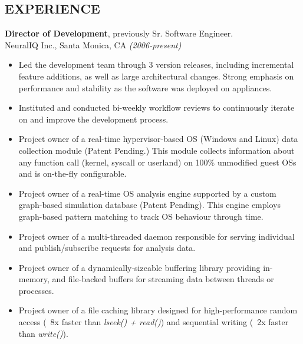 \documentclass[margin]{res}
\begin{document}
\begin{resume}
\section{EXPERIENCE}
\noindent
{\bf Director of Development}, previously Sr. Software Engineer. \\ 
NeuralIQ Inc., Santa Monica, CA {\em (2006-present)} \\ 
\begin{itemize}
  \item Led the development team through 3 version releases, including
    incremental feature additions, as well as large architectural
    changes.  Strong emphasis on performance and stability as the
    software was deployed on appliances.
  \item Instituted and conducted bi-weekly workflow reviews to
    continuously iterate on and improve the development process.
  \item Project owner of a real-time hypervisor-based OS (Windows and
    Linux) data collection module (Patent Pending.)  This module
    collects information about any function call (kernel, syscall or
    userland) on 100\% unmodified guest OSs and is on-the-fly
    configurable.
  \item Project owner of a real-time OS analysis engine supported by a
    custom graph-based simulation database (Patent Pending).  This
    engine employs graph-based pattern matching to track OS behaviour
    through time.
  \item Project owner of a multi-threaded daemon responsible for
    serving individual and publish/subscribe requests for analysis
    data.
  \item Project owner of a dynamically-sizeable buffering library
    providing in-memory, and file-backed buffers for streaming
    data between threads or processes.
  \item Project owner of a file caching library designed for
    high-performance random access (\string~8x faster than {\em lseek() +
      read()}) and sequential writing (\string~2x faster than {\em
      write()}).
\end{itemize}



\end{resume}
\end{document}
